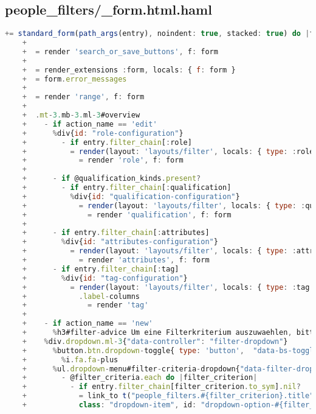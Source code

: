 \newpage


\subsection{people\_filters/\_form.html.haml}
\begin{lstlisting}[language=JavaScript]
    += standard_form(path_args(entry), noindent: true, stacked: true) do |form|
    +
    +  = render 'search_or_save_buttons', f: form
    +
    +  = render_extensions :form, locals: { f: form }
    +  = form.error_messages
    +
    +  = render 'range', f: form
    +
    +  .mt-3.mb-3.ml-3#overview
    +    - if action_name == 'edit'
    +      %div{id: "role-configuration"}
    +        - if entry.filter_chain[:role]
    +          = render(layout: 'layouts/filter', locals: { type: :role }) do
    +            = render 'role', f: form
    +
    +      - if @qualification_kinds.present?
    +        - if entry.filter_chain[:qualification]
    +          %div{id: "qualification-configuration"}
    +            = render(layout: 'layouts/filter', locals: { type: :qualification }) do
    +              = render 'qualification', f: form
    +
    +      - if entry.filter_chain[:attributes]
    +        %div{id: "attributes-configuration"}
    +          = render(layout: 'layouts/filter', locals: { type: :attributes }) do
    +            = render 'attributes', f: form
    +      - if entry.filter_chain[:tag]
    +        %div{id: "tag-configuration"}
    +          = render(layout: 'layouts/filter', locals: { type: :tag }) do
    +            .label-columns
    +              = render 'tag'
    +
    +    - if action_name == 'new'
    +      %h3#filter-advice Um eine Filterkriterium auszuwaehlen, bitte klicke auf den Hinzufuege-Button
    +    %div.dropdown.ml-3{"data-controller": "filter-dropdown"}
    +      %button.btn.dropdown-toggle{ type: 'button',  "data-bs-toggle": "dropdown", "aria-expanded": "false"}
    +        %i.fa.fa-plus
    +      %ul.dropdown-menu#filter-criteria-dropdown{"data-filter-dropdown-target": "menu"}
    +        - @filter_criteria.each do |filter_criterion|
    +          - if entry.filter_chain[filter_criterion.to_sym].nil?
    +            = link_to t("people_filters.#{filter_criterion}.title"), "/groups/#{@group.id}/people_filters/#{filter_criterion}",
    +            class: "dropdown-item", id: "dropdown-option-#{filter_criterion}", data: {turbo_stream: true}    
\end{lstlisting}

\newpage


